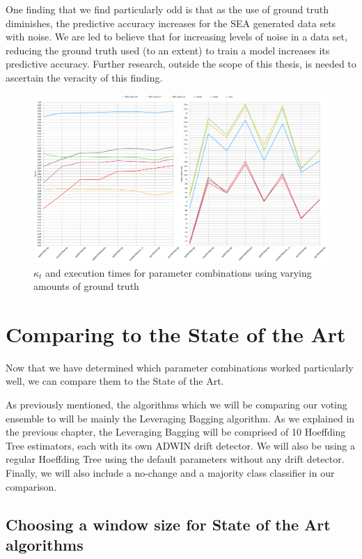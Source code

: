 One finding that we find particularly odd is that as the use of ground truth diminishes, the predictive accuracy increases for the SEA generated data sets with noise. We are led to believe that for increasing levels of noise in a data set, reducing the ground truth used (to an extent) to train a model increases its predictive accuracy. Further research, outside the scope of this thesis, is needed to ascertain the veracity of this finding.

\begin{figure}
  \includegraphics[width=\linewidth]{./images/chapter5/ground_truth_both}
\caption{\label{fig:ground_truth_drop}$\kappa_t$ and execution times for parameter combinations using varying amounts of ground truth}
\end{figure}

\section{Comparing to the State of the Art}

Now that we have determined which parameter combinations worked particularly well, we can compare them to the State of the Art.

As previously mentioned, the algorithms which we will be comparing our voting ensemble to will be mainly the Leveraging Bagging algorithm. As we explained in the previous chapter, the Leveraging Bagging will be comprised of 10 Hoeffding Tree estimators, each with its own ADWIN drift detector. We will also be using a regular Hoeffding Tree using the default parameters without any drift detector. Finally, we will also include a no-change and a majority class classifier in our comparison.

\subsection{Choosing a window size for State of the Art algorithms}

